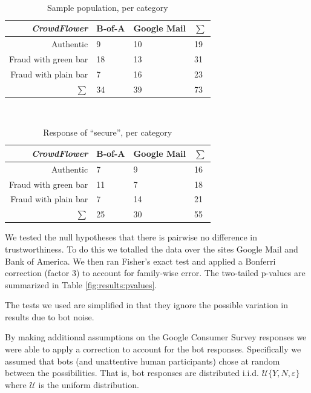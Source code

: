 \documentclass[twoside,letterpaper]{soups}
\begin{document}
\begin{table}
\centering
\caption{Sample population, per category}
\mbox{}\\
\begin{tabular}{|r|l|l|l|}
\hline
\emph{CrowdFlower}   & B-of-A   & Google Mail   & $\sum$ \\
\hline
Authentic            & 9        & 10            & 19 \\
\hline
Fraud with green bar & 18       & 13            & 31 \\
\hline
Fraud with plain bar & 7        & 16            & 23 \\
\hline
$\sum$               & 34       & 39            & 73 \\
\hline
\end{tabular}
\label{fig:results-cf:population}
\end{table}

\begin{table}
\centering
\caption{Response of ``secure'', per category}
\mbox{}\\
\begin{tabular}{|r|l|l|l|}
\hline
\emph{CrowdFlower}   & B-of-A   & Google Mail   & $\sum$ \\
\hline
Authentic            & 7        & 9             & 16 \\
\hline
Fraud with green bar & 11       & 7             & 18 \\
\hline
Fraud with plain bar & 7        & 14            & 21 \\
\hline
$\sum$               & 25       & 30            & 55 \\
\hline
\end{tabular}
\label{fig:results-cf:trusters}
\end{table}


We tested the null hypotheses that there is pairwise no difference in trustworthiness. To do this we totalled the data over the sites Google Mail and Bank of America. We then ran Fisher's exact test and applied a Bonferri correction (factor 3) to account for family-wise error. The two-tailed p-values are summarized in Table \ref{fig:results:pvalues}.

The tests we used are simplified in that they ignore the possible variation in results due to bot noise.

By making additional assumptions on the Google Consumer Survey responses we were able to apply a correction to account for the bot responses. Specifically we assumed that bots (and unattentive human participants) chose at random between the possibilities. That is, bot responses are distributed i.i.d. $\mathcal U\{Y,N,\varepsilon\}$ where $\mathcal U$ is the uniform distribution.
\end{document}
